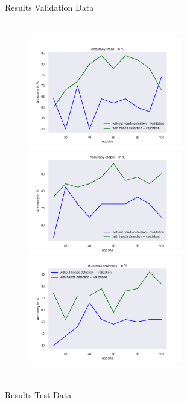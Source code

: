 \documentclass[aspectratio=169]{beamer}
\begin{document}
{\begin{frame}{Results Validation Data}
\begin{columns}
    \begin{figure}
        \centering
        \includegraphics[width=0.6\textwidth]{img/experiment/model_comp_10steps__val_acc_rock.png}     
        \includegraphics[width=0.6\textwidth]{img/experiment/model_comp_10steps__val_acc_paper.png}
        \includegraphics[width=0.6\textwidth]{img/experiment/model_comp_10steps__val_acc_scissors.png}
    \end{figure}
   
	\end{columns}
	\end{frame}
	
	\begin{frame}{Results Test Data}
		\begin{columns}


\end{columns}
\end{frame}}
\end{document}
